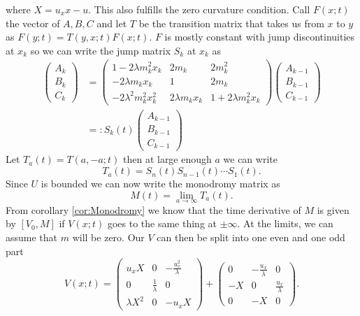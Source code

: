 \documentclass[english,master]{liumaiex}
\theoremstyle{plain}
\theoremstyle{definition}
\begin{document}
where $X = u_x x - u$. This also fulfills the zero curvature condition. Call $F(x;t)$ the vector of $A, B, C$ and let $T$ be the transition matrix that takes us from $x$ to $y$ as $F(y;t) = T(y,x;t)F(x;t)$. $F$ is mostly constant with jump discontinuities at $x_k$ so we can write the jump matrix $S_k$ at $x_k$ as
\begin{equation}
\begin{aligned}
\begin{pmatrix} A_k \\ B_k \\ C_k \end{pmatrix} &= 
\begin{pmatrix}
	1 - 2\lambda m_k^2 x_k & 2m_k & 2m_k^2 \\
	-2\lambda m_k x_k & 1 & 2m_k \\
	-2\lambda^2 m_k^2 x_k^2 & 2\lambda m_k x_k & 1 + 2\lambda m_k^2 x_k
\end{pmatrix}
\begin{pmatrix} A_{k-1} \\ B_{k-1} \\ C_{k-1} \end{pmatrix} \\
&=: S_k(t) 
\begin{pmatrix} A_{k-1} \\ B_{k-1} \\ C_{k-1} \end{pmatrix}
\end{aligned}
\end{equation}
Let $T_a(t) = T(a,-a;t)$ then at large enough $a$ we can write 
\begin{equation}
	T_a(t) = S_n(t)S_{n-1}(t) \cdots S_1(t).
\end{equation}
Since $U$ is bounded we can now write the monodromy matrix as
\begin{equation}
	M(t) = \lim_{a \rightarrow \infty} T_a(t).
\end{equation}
From corollary \ref{cor:Monodromy} we know that the time derivative of $M$ is given by $[V_0, M]$ if $V(x;t)$ goes to the same thing at $\pm \infty$. At the limits, we can assume that $m$ will be zero. Our $V$ can then be split into one even and one odd part
\begin{equation}
	V(x;t) =
\begin{pmatrix}
	u_x X & 0 & -\frac{u_x^2}{\lambda} \\
	0 & \frac{1}{\lambda} & 0 \\
	\lambda X^2 & 0 & -u_x X
\end{pmatrix} +
\begin{pmatrix}
	0  & -\frac{u_x}{\lambda} & 0 \\
	-X & 0 & \frac{u_x}{\lambda} \\
	0 & -X & 0
\end{pmatrix}.
\end{equation}
\end{document}
